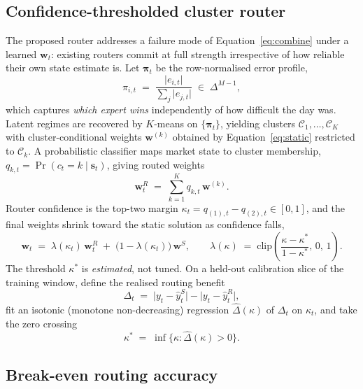 \subsection{Confidence-thresholded cluster router}

The proposed router addresses a failure mode of Equation~\ref{eq:combine} under a
learned $\bm{w}_t$: existing routers commit at full strength irrespective of how
reliable their own state estimate is. Let $\bm{\pi}_t$ be the row-normalised error
profile,
\begin{equation}
\pi_{i,t} \;=\; \frac{\lvert e_{i,t}\rvert}{\sum_{j}\lvert e_{j,t}\rvert}
\;\in\;\Delta^{M-1},
\end{equation}
which captures \emph{which expert wins} independently of how difficult the day was.
Latent regimes are recovered by $K$-means on $\{\bm{\pi}_t\}$, yielding clusters
$\mathcal{C}_1,\dots,\mathcal{C}_K$ with cluster-conditional weights
$\bm{w}^{(k)}$ obtained by Equation~\ref{eq:static} restricted to $\mathcal{C}_k$.
A probabilistic classifier maps market state to cluster membership,
$q_{k,t} = \Pr(c_t = k \mid \bm{s}_t)$, giving routed weights
\begin{equation}
\bm{w}^{R}_t \;=\; \sum_{k=1}^{K} q_{k,t}\, \bm{w}^{(k)} .
\end{equation}
Router confidence is the top-two margin
$\kappa_t = q_{(1),t} - q_{(2),t} \in [0,1]$, and the final weights shrink toward
the static solution as confidence falls,
\begin{equation}
\label{eq:ctcr}
\boxed{\;
\bm{w}_t \;=\; \lambda(\kappa_t)\,\bm{w}^{R}_t \;+\; \big(1-\lambda(\kappa_t)\big)\,\bm{w}^{S},
\qquad
\lambda(\kappa) \;=\; \mathrm{clip}\!\left(\frac{\kappa-\kappa^{*}}{1-\kappa^{*}},\,0,\,1\right).
\;}
\end{equation}
The threshold $\kappa^{*}$ is \emph{estimated}, not tuned. On a held-out
calibration slice of the training window, define the realised routing benefit
\begin{equation}
\Delta_t \;=\; \big\lvert y_t - \hat{y}^{S}_t \big\rvert - \big\lvert y_t - \hat{y}^{R}_t \big\rvert ,
\end{equation}
fit an isotonic (monotone non-decreasing) regression $\widehat{\Delta}(\kappa)$ of
$\Delta_t$ on $\kappa_t$, and take the zero crossing
\begin{equation}
\kappa^{*} \;=\; \inf\{\kappa : \widehat{\Delta}(\kappa) > 0\} .
\end{equation}

\subsection{Break-even routing accuracy}
\label{sec:breakeven}

